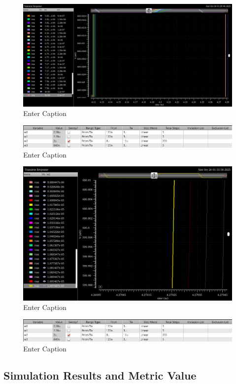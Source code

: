 \documentclass[12pt]{article}
\begin{document}
\begin{figure}[H]
    \centering
    \includegraphics[width=0.5\linewidth]{writeup//figures/wmux_2_parametrics_weep.png}
    \caption{Enter Caption}
\end{figure}

\begin{figure}[H]
    \centering
    \includegraphics[width=0.5\linewidth]{writeup//figures/wmux_1_parametric_sweep_setup.png}
    \caption{Enter Caption}
\end{figure}

\begin{figure}[H]
    \centering
    \includegraphics[width=0.5\linewidth]{writeup//figures/wmux_1_parametrics_weep.png}
    \caption{Enter Caption}
\end{figure}


\begin{figure}[H]
    \centering
    \includegraphics[width=0.5\linewidth]{writeup//figures/wmux_1_parametric_sweep_setup.png}
    \caption{Enter Caption}
\end{figure}




\newpage

\subsection{Simulation Results and Metric Value}
\end{document}
